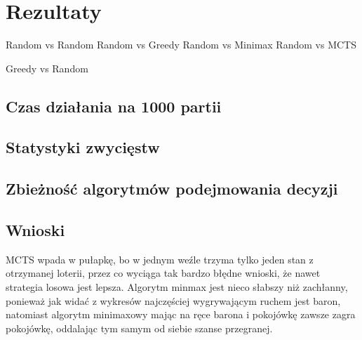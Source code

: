 \chapter{Rezultaty}
\label{cha:rozdz5}

Random vs Random
Random vs Greedy
Random vs Minimax
Random vs MCTS

Greedy vs Random

\section{Czas działania na 1000 partii}

\section{Statystyki zwycięstw}

\section{Zbieżność algorytmów podejmowania decyzji}

\section{Wnioski}
MCTS wpada w pułapkę, bo w jednym weźle trzyma tylko jeden stan z otrzymanej loterii, przez co wyciąga tak bardzo błędne wnioski, że nawet strategia losowa jest lepsza. Algorytm minmax jest nieco słabszy niż zachłanny, ponieważ jak widać z wykresów najczęściej wygrywającym ruchem jest baron, natomiast algorytm minimaxowy mając na ręce barona i pokojówkę zawsze zagra pokojówkę, oddalając tym samym od siebie szanse przegranej.